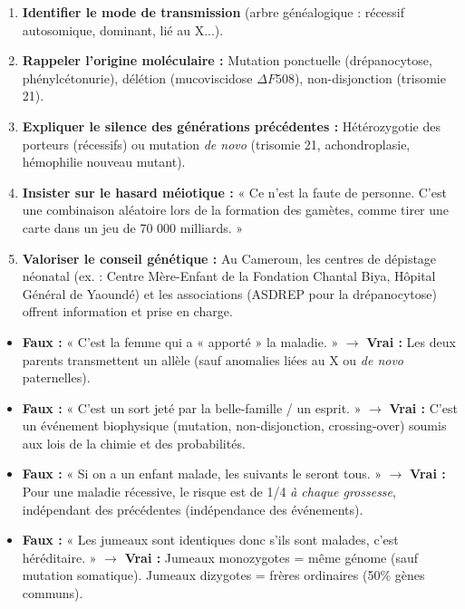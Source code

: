 \documentclass[11pt]{article}
\begin{document}
\begin{methode}
\begin{enumerate}
    \item \textbf{Identifier le mode de transmission} (arbre généalogique : récessif autosomique, dominant, lié au X...).
    \item \textbf{Rappeler l'origine moléculaire :} Mutation ponctuelle (drépanocytose, phénylcétonurie), délétion (mucoviscidose $\Delta F508$), non-disjonction (trisomie 21).
    \item \textbf{Expliquer le silence des générations précédentes :} Hétérozygotie des porteurs (récessifs) ou mutation \emph{de novo} (trisomie 21, achondroplasie, hémophilie nouveau mutant).
    \item \textbf{Insister sur le hasard méiotique :} « Ce n'est la faute de personne. C'est une combinaison aléatoire lors de la formation des gamètes, comme tirer une carte dans un jeu de 70 000 milliards. »
    \item \textbf{Valoriser le conseil génétique :} Au Cameroun, les centres de dépistage néonatal (ex. : Centre Mère-Enfant de la Fondation Chantal Biya, Hôpital Général de Yaoundé) et les associations (ASDREP pour la drépanocytose) offrent information et prise en charge.
\end{enumerate}
\end{methode}

\begin{attention}
\begin{itemize}
    \item \textbf{Faux :} « C'est la femme qui a « apporté » la maladie. » $\rightarrow$ \textbf{Vrai :} Les deux parents transmettent un allèle (sauf anomalies liées au X ou \emph{de novo} paternelles).
    \item \textbf{Faux :} « C'est un sort jeté par la belle-famille / un esprit. » $\rightarrow$ \textbf{Vrai :} C'est un événement biophysique (mutation, non-disjonction, crossing-over) soumis aux lois de la chimie et des probabilités.
    \item \textbf{Faux :} « Si on a un enfant malade, les suivants le seront tous. » $\rightarrow$ \textbf{Vrai :} Pour une maladie récessive, le risque est de 1/4 \emph{à chaque grossesse}, indépendant des précédentes (indépendance des événements).
    \item \textbf{Faux :} « Les jumeaux sont identiques donc s'ils sont malades, c'est héréditaire. » $\rightarrow$ \textbf{Vrai :} Jumeaux monozygotes = même génome (sauf mutation somatique). Jumeaux dizygotes = frères ordinaires (50\% gènes communs).
\end{itemize}
\end{attention}
\end{document}

